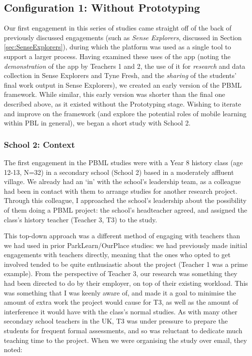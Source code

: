 \subsection{Configuration 1: Without Prototyping}
Our first engagement in this series of studies came straight off of the back of previously discussed engagements (such as \textit{Sense Explorers}, discussed in Section \ref{sec:SenseExplorers}), during which the platform was used as a single tool to support a larger process. Having examined these uses of the app (noting the \textit{demonstration} of the app by Teachers 1 and 2, the use of it for \textit{research} and data collection in Sense Explorers and Tyne Fresh, and the \textit{sharing} of the students' final work output in Sense Explorers), we created an early version of the PBML framework. While similar, this early version was shorter than the final one described above, as it existed without the Prototyping stage. Wishing to iterate and improve on the framework (and explore the potential roles of mobile learning within PBL in general), we began a short study with School 2.

\subsubsection{School 2: Context}
The first engagement in the PBML studies were with a Year 8 history class (age 12-13, N=32) in a secondary school (School 2) based in a moderately affluent village. We already had an `in' with the school's leadership team, as a colleague had been in contact with them to arrange studies for another research project. Through this colleague, I approached the school's leadership about the possibility of them doing a PBML project: the school's headteacher agreed, and assigned the class's history teacher (Teacher 3, T3) to the study. 

This top-down approach was a different method of engaging with teachers than we had used in prior ParkLearn/OurPlace studies: we had previously made initial engagements with teachers directly, meaning that the ones who opted to get involved tended to be quite enthusiastic about the project (Teacher 1 was a prime example). From the perspective of Teacher 3, our research was something they had been directed to do by their employer, on top of their existing workload. This was something that I was keenly aware of, and made it a goal to minimise the amount of extra work the project would cause for T3, as well as the amount of interference it would have with the class's normal studies. As with many other secondary school teachers in the UK, T3 was under pressure to prepare the students for frequent formal assessments, and so was reluctant to dedicate much teaching time to the project. When we were organising the study over email, they noted:

